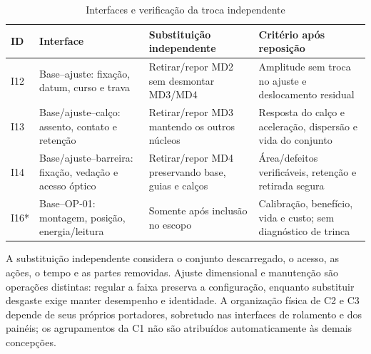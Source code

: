 \begin{table}[H]
\centering\scriptsize\caption{Interfaces e verificação da troca independente}\label{tab:mim-interfaces}
\begin{tabularx}{\textwidth}{L{1.1cm}L{3.7cm}YY}
\toprule\textbf{ID}&\textbf{Interface}&\textbf{Substituição independente}&\textbf{Critério após reposição}\\\midrule
I12&Base--ajuste: fixação, datum, curso e trava&Retirar/repor MD2 sem desmontar MD3/MD4&Amplitude sem troca no ajuste e deslocamento residual\\
I13&Base/ajuste--calço: assento, contato e retenção&Retirar/repor MD3 mantendo os outros núcleos&Resposta do calço e aceleração, dispersão e vida do conjunto\\
I14&Base/ajuste--barreira: fixação, vedação e acesso óptico&Retirar/repor MD4 preservando base, guias e calços&Área/defeitos verificáveis, retenção e retirada segura\\
I16*&Base--OP-01: montagem, posição, energia/leitura&Somente após inclusão no escopo&Calibração, benefício, vida e custo; sem diagnóstico de trinca\\
\bottomrule\end{tabularx}
\end{table}

A substituição independente considera o conjunto descarregado, o acesso, as ações, o tempo e as partes removidas. Ajuste dimensional e manutenção são operações distintas: regular a faixa preserva a configuração, enquanto substituir desgaste exige manter desempenho e identidade. A organização física de C2 e C3 depende de seus próprios portadores, sobretudo nas interfaces de rolamento e dos painéis; os agrupamentos da C1 não são atribuídos automaticamente às demais concepções.
